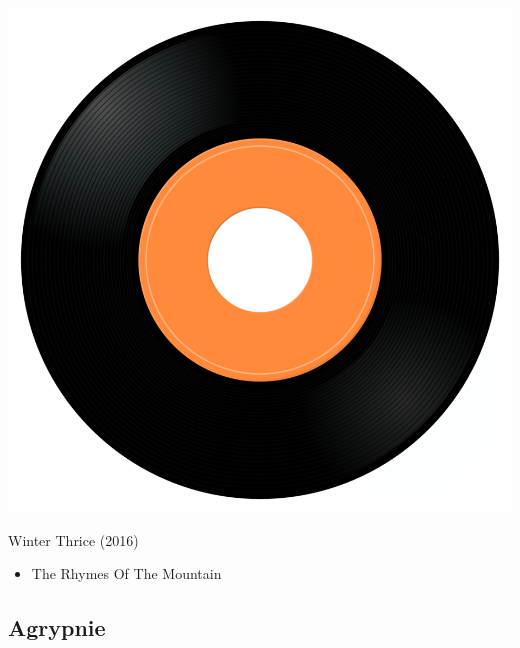 \begin{minipage}[t]{0.25\textwidth}
\captionsetup{type=figure}
\includegraphics[width=\textwidth]{Images/cover.png}
\caption*{Winter Thrice (2016)}
\end{minipage}
\begin{minipage}[t]{0.25\textwidth}\vspace{0pt}
\begin{itemize}[nosep,leftmargin=1em,labelwidth=*,align=left]
	\setlength{\itemsep}{0pt}
	\item The Rhymes Of The Mountain
\end{itemize}
\end{minipage}

\subsection{Agrypnie}

